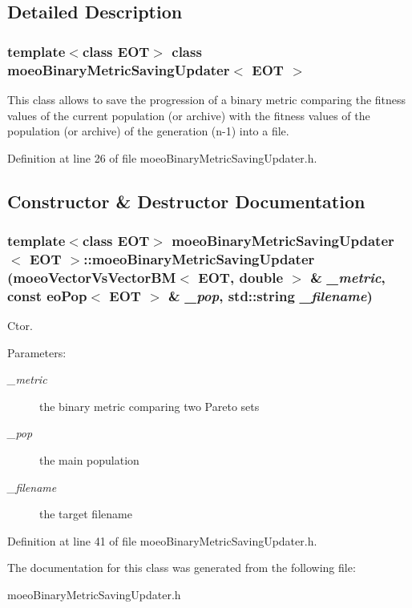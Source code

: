 \subsection{Detailed Description}
\subsubsection*{template$<$class EOT$>$ class moeo\-Binary\-Metric\-Saving\-Updater$<$ EOT $>$}

This class allows to save the progression of a binary metric comparing the fitness values of the current population (or archive) with the fitness values of the population (or archive) of the generation (n-1) into a file. 



Definition at line 26 of file moeo\-Binary\-Metric\-Saving\-Updater.h.

\subsection{Constructor \& Destructor Documentation}
\subsubsection{\setlength{\rightskip}{0pt plus 5cm}template$<$class EOT$>$ {\bf moeo\-Binary\-Metric\-Saving\-Updater}$<$ EOT $>$::{\bf moeo\-Binary\-Metric\-Saving\-Updater} ({\bf moeo\-Vector\-Vs\-Vector\-BM}$<$ EOT, double $>$ \& {\em \_\-metric}, const eo\-Pop$<$ EOT $>$ \& {\em \_\-pop}, std::string {\em \_\-filename})\hspace{0.3cm}{\tt  [inline]}}\label{classmoeoBinaryMetricSavingUpdater_978c6e8a99459722220387f911c1f461}


Ctor. 

\begin{Desc}
\item[Parameters:]
\begin{description}
\item[{\em \_\-metric}]the binary metric comparing two Pareto sets \item[{\em \_\-pop}]the main population \item[{\em \_\-filename}]the target filename \end{description}
\end{Desc}


Definition at line 41 of file moeo\-Binary\-Metric\-Saving\-Updater.h.

The documentation for this class was generated from the following file:\begin{CompactItemize}
\item 
moeo\-Binary\-Metric\-Saving\-Updater.h\end{CompactItemize}
